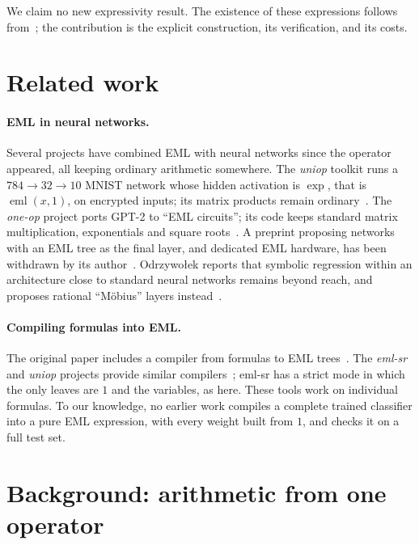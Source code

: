 \documentclass[11pt]{article}
\newcommand{\eml}{\operatorname{eml}}
\begin{document}
We claim no new expressivity result. The existence of these expressions
follows from~\cite{odrzywolek2026}; the contribution is the explicit
construction, its verification, and its costs.

\section{Related work}
\label{sec:related}

\paragraph{EML in neural networks.}
Several projects have combined EML with neural networks since the operator
appeared, all keeping ordinary arithmetic somewhere. The \emph{uniop} toolkit
runs a $784\!\to\!32\!\to\!10$ MNIST network whose hidden activation is
$\exp$, that is $\eml(x,1)$, on encrypted inputs; its matrix products remain
ordinary~\cite{uniop}. The \emph{one-op} project ports GPT-2 to ``EML
circuits''; its code keeps standard matrix multiplication, exponentials
and square roots~\cite{oneop}. A preprint proposing networks with
an EML tree as the final layer, and dedicated EML hardware, has been
withdrawn by its author~\cite{ipek2026}. Odrzywołek reports that symbolic
regression within an architecture close to standard neural networks remains
beyond reach, and proposes rational ``M\"obius'' layers
instead~\cite{odrzywolek2026b}.

\paragraph{Compiling formulas into EML.}
The original paper includes a compiler from formulas to EML
trees~\cite{odrzywolek2026}. The \emph{eml-sr} and \emph{uniop} projects
provide similar compilers~\cite{emlsr,uniop}; eml-sr has a strict mode in
which the only leaves are $1$ and the variables, as here. These tools work on
individual formulas. To our knowledge, no earlier work compiles a complete
trained classifier into a pure EML expression, with every weight built from
$1$, and checks it on a full test set.

\section{Background: arithmetic from one operator}
\label{sec:background}
\end{document}
